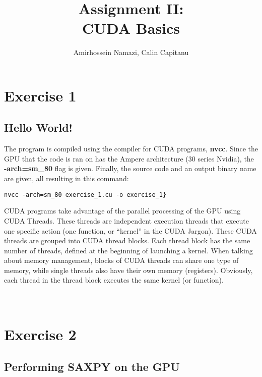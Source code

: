\documentclass[english]{exam}
\begin{document}
\title{Assignment II:\\ CUDA Basics}
\author{Amirhossein Namazi, Calin Capitanu}

\maketitle


\chapter{Exercise 1}
\section*{Hello World!}

The program is compiled using the compiler for CUDA programs, \textbf{nvcc}. Since the GPU that the code is ran on has the Ampere architecture (30 series Nvidia), the \textbf{-arch=sm\_80} flag is given. Finally, the source code and an output binary name are given, all resulting in this command: \\
\begin{lstlisting}
nvcc -arch=sm_80 exercise_1.cu -o exercise_1}
\end{lstlisting}

\noindent

CUDA programs take advantage of the parallel processing of the GPU using CUDA Threads. These threads are independent execution threads that execute one specific action (one function, or ``kernel'' in the CUDA Jargon). These CUDA threads are grouped into CUDA thread blocks. Each thread block has the same number of threads, defined at the beginning of launching a kernel. When talking about memory management, blocks of CUDA threads can share one type of memory, while single threads also have their own memory (registers). Obviously, each thread in the thread block executes the same kernel (or function).\\\\\\

\clearpage
\chapter{Exercise 2}
\section*{Performing SAXPY on the GPU}
\end{document}
